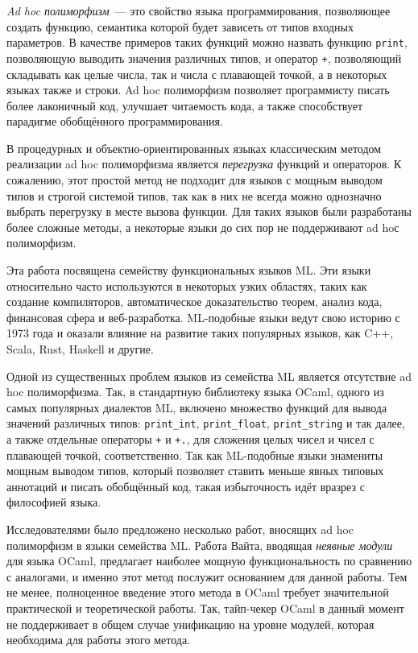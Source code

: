 \documentclass[../diploma.tex]{subfiles}
\begin{document}
 \label{sec:introduction}

\textit{Ad hoc полиморфизм}~--- это свойство языка программирования, позволяющее создать функцию, семантика которой будет зависеть от типов входных параметров. В качестве примеров таких функций можно назвать функцию \texttt{print}, позволяющую выводить значения различных типов, и оператор \texttt{+}, позволяющий складывать как целые числа, так и числа с плавающей точкой, а в некоторых языках также и строки. Ad hoc полиморфизм позволяет программисту писать более лаконичный код, улучшает читаемость кода, а также способствует парадигме обобщённого программирования.

В процедурных и объектно-ориентированных языках классическим методом реализации ad hoc полиморфизма является \textit{перегрузка} функций и операторов. К сожалению, этот простой метод не подходит для языков с мощным выводом типов и строгой системой типов, так как в них не всегда можно однозначно выбрать перегрузку в месте вызова функции. Для таких языков были разработаны более сложные методы, а некоторые языки до сих пор не поддерживают ad hoс полиморфизм.

Эта работа посвящена семейству функциональных языков ML. Эти языки относительно часто используются в некоторых узких областях, таких как создание компиляторов, автоматическое доказательство теорем, анализ кода, финансовая сфера и веб-разработка. ML-подобные языки ведут свою историю с 1973 года и оказали влияние на развитие таких популярных языков, как C++, Scala, Rust, Haskell и другие.

Одной из существенных проблем языков из семейства ML является отсутствие ad hoc полиморфизма. Так, в стандартную библиотеку языка OCaml, одного из самых популярных диалектов ML, включено множество функций для вывода значений различных типов: \texttt{print\_int}, \texttt{print\_float}, \texttt{print\_string} и так далее, а также отдельные операторы \texttt{+} и \texttt{+.}, для сложения целых чисел и чисел с плавающей точкой, соответственно. Так как ML-подобные языки знамениты мощным выводом типов, который позволяет ставить меньше явных типовых аннотаций и писать обобщённый код, такая избыточность идёт вразрез с философией языка.

Исследователями было предложено несколько работ, вносящих ad hoc полиморфизм в языки семейства ML. Работа Вайта, вводящая \textit{неявные модули} для языка OCaml, предлагает наиболее мощную функциональность по сравнению с аналогами, и именно этот метод послужит основанием для данной работы. Тем не менее, полноценное введение этого метода в OCaml требует значительной практической и теоретической работы. Так, тайп-чекер OCaml в данный момент не поддерживает в общем случае унификацию на уровне модулей, которая необходима для работы этого метода.
\end{document}
